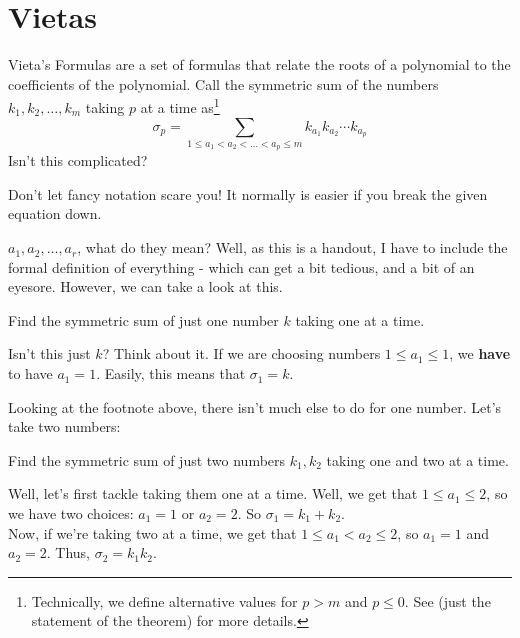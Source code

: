 \documentclass[11pt,titlepage]{scrartcl}
\begin{document}
\section{Vietas}
Vieta's Formulas are a set of formulas that relate the roots of a polynomial to the coefficients of the polynomial. Call the symmetric sum of the numbers $k_1,k_2,\ldots,k_m$ taking $p$ at a time as\footnote{Technically, we define alternative values for $p>m$ and $p\leq 0$. See  (just the statement of the theorem) for more details.}
\[\sigma_p=\sum_{1\leq a_1<a_2<\ldots<a_p\leq m}k_{a_1}k_{a_2}\cdots k_{a_p}\]
Isn't this complicated?
\begin{remark}
Don't let fancy notation scare you! It normally is easier if you break the given equation down.
\end{remark}$a_1,a_2,\ldots,a_r$, what do they mean? Well, as this is a handout, I have to include the formal definition of everything - which can get a bit tedious, and a bit of an eyesore. However, we can take a look at this.
\begin{example}
Find the symmetric sum of just one number $k$ taking one at a time.
\end{example}
\begin{soln}
Isn't this just $k$? Think about it. If we are choosing numbers $1\leq a_1\leq 1$, we \textbf{have} to have $a_1=1$. Easily, this means that $\sigma_1=k$.
\end{soln}
Looking at the footnote above, there isn't much else to do for one number. Let's take two numbers:
\begin{example}
Find the symmetric sum of just two numbers $k_1,k_2$ taking one and two at a time.
\end{example}
\begin{soln}
Well, let's first tackle taking them one at a time. Well, we get that $1\leq a_1\leq 2$, so we have two choices: $a_1=1$ or $a_2=2$. So $\sigma_1=k_1+k_2$.\\[2\baselineskip]
Now, if we're taking two at a time, we get that $1\leq a_1<a_2\leq 2$, so $a_1=1$ and $a_2=2$. Thus, $\sigma_2=k_1k_2$.
\end{soln}
\end{document}
